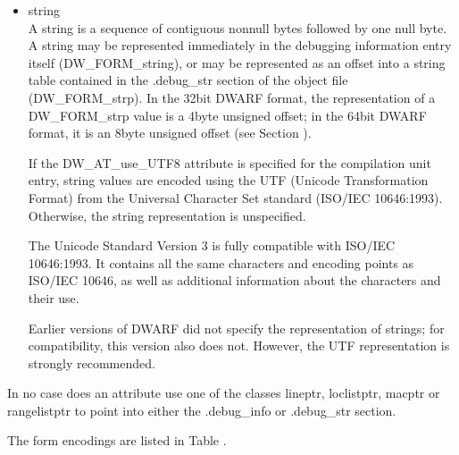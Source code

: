 \begin{itemize}
The use of compilation unit relative references will reduce the
number of link\dash time relocations and so speed up linking. The
use of the second and third type of reference allows for the
sharing of information, such as types, across compilation
units.

A reference to any kind of compilation unit identifies the
debugging information entry for that unit, not the preceding
header.

\item string \\
A string is a sequence of contiguous non\dash null bytes followed by
one null byte. A string may be represented immediately in the
debugging information entry itself (DW\_FORM\_string), or may
be represented as an offset into a string table contained in
the .debug\_str section of the object file (DW\_FORM\_strp). In
the 32\dash bit DWARF format, the representation of a DW\_FORM\_strp
value is a 4\dash byte unsigned offset; in the 64\dash bit DWARF format,
it is an 8\dash byte unsigned offset 
(see Section ).

If the DW\_AT\_use\_UTF8 attribute is specified for the
compilation unit entry, string values are encoded using the
UTF (Unicode Transformation Format) from the Universal
Character Set standard (ISO/IEC 10646:1993). Otherwise,
the string representation is unspecified.

The Unicode Standard Version 3 is fully compatible with
ISO/IEC 10646:1993. It contains all the same characters
and encoding points as ISO/IEC 10646, as well as additional
information about the characters and their use.

Earlier versions of DWARF did not specify the representation
of strings; for compatibility, this version also does
not. However, the UTF representation is strongly recommended.

\end{itemize}

In no case does an attribute use one of the classes lineptr,
loclistptr, macptr or rangelistptr to point into either the
.debug\_info or .debug\_str section.

The form encodings are listed in 
Table .


